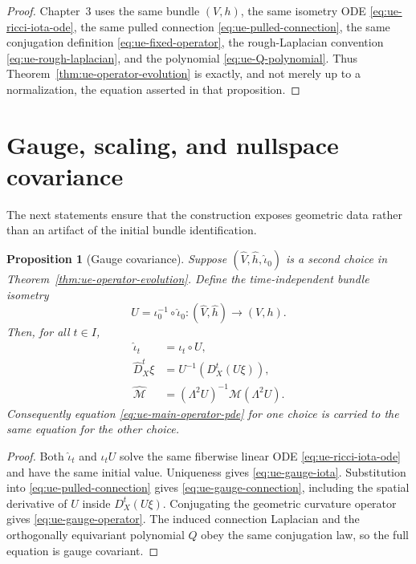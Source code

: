 \documentclass[10pt]{coll-l}
\newtheorem{proposition}[theorem]{Proposition}
\theoremstyle{definition}
\theoremstyle{remark}
\numberwithin{section}{chapter}
\numberwithin{equation}{chapter}
\begin{document}
\begin{proof}
Chapter~3 uses the same bundle $(V,h)$, the same isometry ODE
\eqref{eq:ue-ricci-iota-ode}, the same pulled connection
\eqref{eq:ue-pulled-connection}, the same conjugation definition
\eqref{eq:ue-fixed-operator}, the rough-Laplacian convention
\eqref{eq:ue-rough-laplacian}, and the polynomial
\eqref{eq:ue-Q-polynomial}.  Thus
Theorem~\ref{thm:ue-operator-evolution} is exactly, and not merely up to a
normalization, the equation asserted in that proposition.
\end{proof}

\section{Gauge, scaling, and nullspace covariance}
\label{sec:ue-covariance}

The next statements ensure that the construction exposes geometric data
rather than an artifact of the initial bundle identification.

\begin{proposition}[Gauge covariance]
\label{prop:ue-gauge-covariance}
Suppose $(\widehat V,\widehat h,\widehat\iota_0)$ is a second choice in
Theorem~\ref{thm:ue-operator-evolution}.  Define the time-independent
bundle isometry
\[
       U=\iota_0^{-1}\circ\widehat\iota_0:
          (\widehat V,\widehat h)\longrightarrow(V,h).
\]
Then, for all $t\in I$,
\begin{align}
 \widehat\iota_t&=\iota_t\circ U,                        \label{eq:ue-gauge-iota}\\
 \widehat D_X^t\xi
   &=U^{-1}\!\left(D_X^t(U\xi)\right),                   \label{eq:ue-gauge-connection}\\
 \widehat{\mathcal M}
   &=(\Lambda^2U)^{-1}\mathcal M(\Lambda^2U).            \label{eq:ue-gauge-operator}
\end{align}
Consequently equation \eqref{eq:ue-main-operator-pde} for one choice is
carried to the same equation for the other choice.
\end{proposition}

\begin{proof}
Both $\widehat\iota_t$ and $\iota_tU$ solve the same fiberwise linear ODE
\eqref{eq:ue-ricci-iota-ode} and have the same initial value.  Uniqueness
gives \eqref{eq:ue-gauge-iota}.  Substitution into
\eqref{eq:ue-pulled-connection} gives
\eqref{eq:ue-gauge-connection}, including the spatial derivative of $U$
inside $D_X^t(U\xi)$.  Conjugating the geometric curvature operator gives
\eqref{eq:ue-gauge-operator}.  The induced connection Laplacian and the
orthogonally equivariant polynomial $Q$ obey the same conjugation law, so
the full equation is gauge covariant.
\end{proof}
\end{document}
